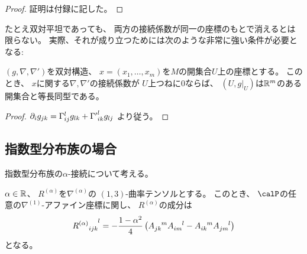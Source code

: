 \documentclass[report]{jlreq}
\begin{document}

\begin{proof}
    証明は付録に記した。
\end{proof}

たとえ双対平坦であっても、
両方の接続係数が同一の座標のもとで消えるとは限らない。
実際、それが成り立つためには次のような非常に強い条件が必要となる:

\begin{proposition}
    $(g, \nabla, \nabla')$を双対構造、
    $x = (x_1, \dots, x_m)$を$M$の開集合$U$上の座標とする。
    このとき、
    $x$に関する$\nabla, \nabla'$の接続係数が
    $U$上つねに$0$ならば、
    $(U, g|_U)$は$\mathbb{R}^m$のある開集合と等長同型である。
\end{proposition}

\begin{proof}
    $\partial_i g_{jk} = \Gamma_{ij}^l g_{lk} + {\Gamma'}_{ik}^l g_{lj}$
    より従う。
\end{proof}

\subsection{指数型分布族の場合}

指数型分布族の$\alpha$-接続について考える。

\begin{proposition}[曲率のACテンソルによる表示]
    $\alpha \in \mathbb{R}$、
    $R^{(\alpha)}$を$\nabla^{(\alpha)}$の
    $(1, 3)$-曲率テンソルとする。
    このとき、
    $\calP$の任意の$\nabla^{(1)}$-アファイン座標に関し、
    $R^{(\alpha)}$の成分は
    \begin{equation}
        {R^{(\alpha)}}_{ijk}^{\hphantom{ijk}l}
            =
                - \frac{1 - \alpha^2}{4}
                \left({
                    A_{jk}^{\hphantom{jk}m} A_{im}^{\hphantom{im}l}
                    - A_{ik}^{\hphantom{ik}m} A_{jm}^{\hphantom{jm}l}
                }\right)
    \end{equation}
    となる。
\end{proposition}
\end{document}
